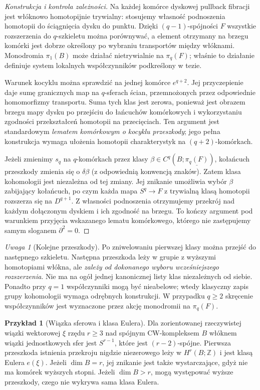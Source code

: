 \documentclass[11pt,a4paper,oneside]{report}
\newcommand{\Z}{\mathbb{Z}}
\theoremstyle{plain}
\theoremstyle{definition}
\newtheorem{przyklad}[twierdzenie]{Przykład}
\theoremstyle{remark}
\newtheorem{uwaga}[twierdzenie]{Uwaga}
\begin{document}
\begin{proof}[Konstrukcja i kontrola zależności]
Na każdej komórce dyskowej pullback fibracji jest
włóknowo homotopijnie trywialny: stosujemy własność
podnoszenia homotopii do ściągnięcia dysku do punktu.
Dzięki $(q-1)$-spójności $F$ wszystkie rozszerzenia do
$q$-szkieletu można porównywać, a element otrzymany na
brzegu komórki jest dobrze określony po wybraniu transportów
między włóknami. Monodromia $\pi_1(B)$ może działać
nietrywialnie na $\pi_q(F)$; właśnie to działanie definiuje
system lokalnych współczynników podkreślony w tezie.

Warunek kocyklu można sprawdzić na jednej komórce
$e^{q+2}$. Jej przyczepienie daje sumę granicznych map na
$q$-sferach ścian, przemnożonych przez odpowiednie
homomorfizmy transportu. Suma tych klas jest zerowa,
ponieważ jest obrazem brzegu mapy dysku po przejściu do
łańcuchów komórkowych i wykorzystaniu zgodności
przekształceń homotopii na przecięciach. Ten argument
jest standardowym \emph{lematem komórkowym o kocyklu
przeszkody}; jego pełna konstrukcja wymaga ułożenia
homotopii charakterystyk na $(q+2)$-komórkach.

Jeżeli zmienimy $s_q$ na $q$-komórkach przez klasy
$\beta\in C^q(B;\underline{\pi_q(F)})$, kołańcuch
przeszkody zmienia się o $\delta\beta$ (z odpowiednią
konwencją znaków). Zatem klasa kohomologii jest
niezależna od tej zmiany. Jej znikanie umożliwia wybór
$\beta$ zabijający kołańcuch, po czym każda mapa
$S^q\to F$ z trywialną klasą homotopii rozszerza się
na $D^{q+1}$. Z własności podnoszenia otrzymujemy
przekrój nad każdym dołączonym dyskiem i ich zgodność
na brzegu. To kończy argument pod warunkiem przyjęcia
wskazanego lematu komórkowego, którego nie zastępujemy
samym sloganem $\partial^2=0$.
\end{proof}
\begin{uwaga}[Kolejne przeszkody]
Po zniwelowaniu pierwszej klasy można przejść do następnego
szkieletu. Następna przeszkoda leży w grupie z wyższymi
homotopiami włókna, ale \emph{zależy od dokonanego wyboru
wcześniejszego rozszerzenia}. Nie ma na ogół jednej
kanonicznej listy klas niezależnych od siebie.
Ponadto przy $q=1$ współczynniki mogą być nieabelowe;
wtedy klasyczny zapis grupy kohomologii wymaga odrębnych
konstrukcji. W przypadku $q\ge2$ skręcenie współczynników
jest wyznaczone przez akcję monodromii na $\pi_q(F)$.
\end{uwaga}
\begin{przyklad}[Wiązka sferowa i klasa Eulera]
Dla zorientowanej rzeczywistej wiązki wektorowej $\xi$ rzędu
$r\ge3$ nad spójnym CW-kompleksem $B$ włóknem wiązki
jednostkowych sfer jest $S^{r-1}$, które jest $(r-2)$-spójne.
Pierwsza przeszkoda istnienia przekroju nigdzie niezerowego
leży w $H^r(B;\Z)$ i jest klasą Eulera $e(\xi)$.
Jeżeli $\dim B=r$, jej znikanie jest także wystarczające,
gdyż nie ma komórek wyższych stopni. Jeżeli
$\dim B>r$, mogą występować wyższe przeszkody, czego
nie wykrywa sama klasa Eulera.
\end{przyklad}
\end{document}
